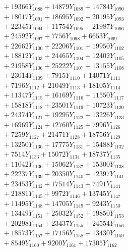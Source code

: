\documentclass[a4paper,10pt]{article}
\begin{document}
{\begin{align}
&\;  + 19366 Y_{1088} + 14879 Y_{1089} + 14784 Y_{1090} \\[0.3ex]
&\;  + 18017 Y_{1091} + 18695 Y_{1092} + 20195 Y_{1093} \\[0.3ex]
&\;  + 22345 Y_{1094} + 11754 Y_{1095} + 21987 Y_{1096} \\[0.3ex]
&\;  + 24592 Y_{1097} + 7756 Y_{1098} + 6653 Y_{1099} \\[0.3ex]
&\;  + 22662 Y_{1100} + 22206 Y_{1101} + 19950 Y_{1102} \\[0.3ex]
&\;  + 18812 Y_{1103} + 24465 Y_{1104} + 12402 Y_{1105} \\[0.3ex]
&\;  + 21958 Y_{1106} + 25222 Y_{1107} + 13155 Y_{1108} \\[0.5ex]\allowbreak
&\;  + 23014 Y_{1109} + 7915 Y_{1110} + 14071 Y_{1111} \\[0.3ex]
&\;  + 7196 Y_{1112} + 21049 Y_{1113} + 18105 Y_{1114} \\[0.3ex]
&\;  + 11347 Y_{1115} + 16169 Y_{1116} + 11550 Y_{1117} \\[0.3ex]
&\;  + 15818 Y_{1118} + 23501 Y_{1119} + 10723 Y_{1120} \\[0.3ex]
&\;  + 24374 Y_{1121} + 19295 Y_{1122} + 13226 Y_{1123} \\[0.3ex]
&\;  + 16969 Y_{1124} + 12760 Y_{1125} + 7996 Y_{1126} \\[0.3ex]
&\;  + 7259 Y_{1127} + 21471 Y_{1128} + 18756 Y_{1129} \\[0.3ex]
&\;  + 13250 Y_{1130} + 17775 Y_{1131} + 15488 Y_{1132} \\[0.3ex]
&\;  + 7514 Y_{1133} + 15072 Y_{1134} + 18737 Y_{1135} \\[0.3ex]
&\;  + 11042 Y_{1136} + 15062 Y_{1137} + 15300 Y_{1138} \\[0.5ex]\allowbreak
&\;  + 22237 Y_{1139} + 20350 Y_{1140} + 12397 Y_{1141} \\[0.3ex]
&\;  + 23453 Y_{1142} + 17514 Y_{1143} + 7491 Y_{1144} \\[0.3ex]
&\;  + 21881 Y_{1145} + 9972 Y_{1146} + 13745 Y_{1147} \\[0.3ex]
&\;  + 11495 Y_{1148} + 14705 Y_{1149} + 9243 Y_{1150} \\[0.3ex]
&\;  + 13449 Y_{1151} + 25032 Y_{1152} + 19850 Y_{1153} \\[0.3ex]
&\;  + 20298 Y_{1154} + 23437 Y_{1155} + 24554 Y_{1156} \\[0.3ex]
&\;  + 18573 Y_{1157} + 17156 Y_{1158} + 13430 Y_{1159} \\[0.3ex]
&\;  + 8549 Y_{1160} + 9200 Y_{1161} + 17305 Y_{1162} \\[0.3ex]

\end{align}}
\end{document}
